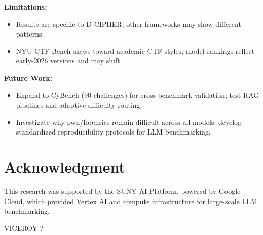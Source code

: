 \documentclass[conference]{IEEEtran}
\begin{document}
\noindent\textbf{Limitations:}
\begin{itemize}
  \item Results are specific to D-CIPHER; other frameworks may show different patterns.
  \item NYU CTF Bench skews toward academic CTF styles; model rankings reflect early-2026 versions and may shift.
\end{itemize}

\noindent\textbf{Future Work:}
\begin{itemize}
  \item Expand to CyBench (90 challenges) for cross-benchmark validation; test RAG pipelines and adaptive difficulty routing.
  \item Investigate why pwn/forensics remain difficult across all models; develop standardized reproducibility protocols for LLM benchmarking.
\end{itemize}


\section*{Acknowledgment}

This research was supported by the SUNY AI Platform, powered by Google Cloud, which provided Vertex AI and compute infrastructure for large-scale LLM benchmarking.

VICEROY ?

\nocite{*}

\end{document}
